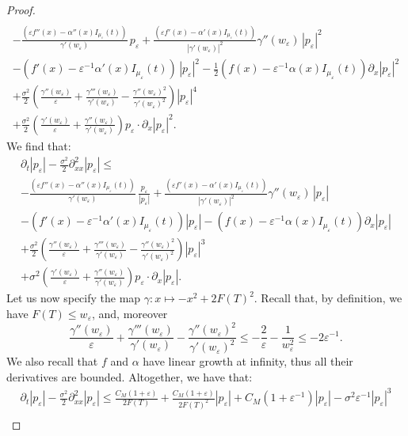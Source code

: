 \documentclass[onefignum,onetabnum]{siamart190516}
\newcommand{\1}{\mathbbm{1}}
\newcommand{\eps}{\varepsilon}
\begin{document}
\begin{proof}
\begin{multline*}
\\
-\frac{\left(\eps f''(x) - \alpha''(x)I_{\mu_\eps}(t) \right)}{\gamma'(w_\eps)}\, p_\eps+\frac{\left(\eps f'(x) - \alpha'(x)I_{\mu_\eps}(t) \right)}{|\gamma'(w_\eps)|^2}\gamma''(w_\eps)\,|p_\eps|^2
\\
-  \left( f'(x)- \eps^{-1}\alpha'(x) I_{\mu_\eps}(t)\right)\,|p_\eps|^2-  \frac12\left( f(x)- \eps^{-1}\alpha(x) I_{\mu_\eps}(t)\right)\partial_x|p_\eps|^2
\\
 + \frac{\sigma^2}{2}\left(\frac{\gamma''(w_\eps)}{\eps}+\frac{\gamma'''(w_\eps)}{\gamma'(w_\eps)}-\frac{\gamma''(w_\eps)^2}{\gamma'(w_\eps)^2}\right) |p_\eps|^4
 \\ 
 + \frac{\sigma^2}{2}\left(\frac{\gamma'(w_\eps)}{\eps}+\frac{\gamma''(w_\eps)}{\gamma'(w_\eps)}\right) p_\eps \cdot\partial_x |p_\eps|^2.
\end{multline*}
We find that:
\begin{multline*}
\partial_t|p_\eps|-\frac{\sigma^2}{2}\partial^2_{xx}|p_\eps|
\leq 
\\
-\frac{\left(\eps f''(x) - \alpha''(x)I_{\mu_\eps}(t) \right)}{\gamma'(w_\eps)}\, \frac{p_\eps}{|p_\eps|}+\frac{\left(\eps f'(x) - \alpha'(x)I_{\mu_\eps}(t) \right)}{|\gamma'(w_\eps)|^2}\gamma''(w_\eps)\,|p_\eps|
\\
-  \left( f'(x)- \eps^{-1}\alpha'(x) I_{\mu_\eps}(t)\right)|p_\eps|-  \left( f(x)- \eps^{-1}\alpha(x) I_{\mu_\eps}(t)\right)\partial_x|p_\eps|
\\
 + \frac{\sigma^2}{2}\left(\frac{\gamma''(w_\eps)}{\eps}+\frac{\gamma'''(w_\eps)}{\gamma'(w_\eps)}-\frac{\gamma''(w_\eps)^2}{\gamma'(w_\eps)^2}\right) |p_\eps|^3
 \\ 
 + \sigma^2\left(\frac{\gamma'(w_\eps)}{\eps}+\frac{\gamma''(w_\eps)}{\gamma'(w_\eps)}\right) p_\eps \cdot\partial_x |p_\eps|.
\end{multline*}
Let us now specify the map $\gamma: x\mapsto - x^2+2F(T)^2$. Recall that, by definition, we have $F(T)\leq w_\eps$, and, moreover
$$
\frac{\gamma''(w_\eps)}{\eps}+\frac{\gamma'''(w_\eps)}{\gamma'(w_\eps)}-\frac{\gamma''(w_\eps)^2}{\gamma'(w_\eps)^2} \leq -\frac{2}{\eps}-\frac{1}{w_\eps^2}\leq -2\eps^{-1}.
$$
We also recall that $f$ and $\alpha$ have linear growth at infinity, thus all their derivatives are bounded. Altogether, we have that:
\begin{multline*}
\partial_t|p_\eps|-\frac{\sigma^2}{2}\partial^2_{xx}|p_\eps|
\leq \frac{C_M(1+\eps)}{2F(T)}+\frac{C_M(1+\eps)}{2F(T)^2}|p_\eps|
+C_M(1+\eps^{-1})|p_\eps|- \sigma^2\eps^{-1} |p_\eps|^3
\\

\end{multline*}
\end{proof}
\end{document}
